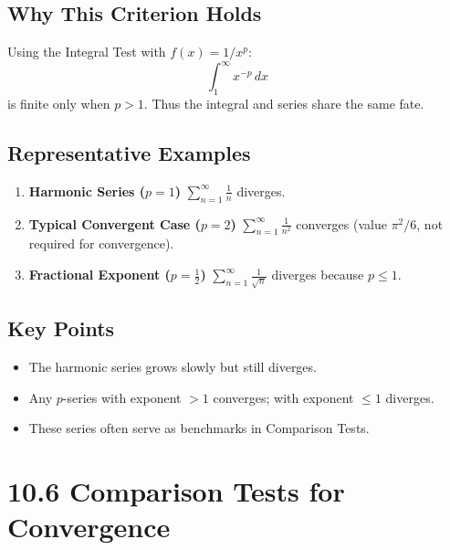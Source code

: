\documentclass{article}
\begin{document}
\subsection*{Why This Criterion Holds}
Using the Integral Test with \(f(x)=1/x^{p}\):
\[
\int_{1}^{\infty} x^{-p}\,dx
\]
is finite only when \(p>1\).  
Thus the integral and series share the same fate.

\subsection*{Representative Examples}

\begin{enumerate}[label=\textbf{\arabic*.},itemsep=8pt]

  \item \textbf{Harmonic Series (\(p=1\))}  
        \(\displaystyle\sum_{n=1}^{\infty}\frac{1}{n}\) diverges.

  \item \textbf{Typical Convergent Case (\(p=2\))}  
        \(\displaystyle\sum_{n=1}^{\infty}\frac{1}{n^{2}}\) converges  
        (value \(\pi^{2}/6\), not required for convergence).

  \item \textbf{Fractional Exponent (\(p=\tfrac12\))}  
        \(\displaystyle\sum_{n=1}^{\infty}\frac{1}{\sqrt{n}}\) diverges because \(p\le1\).

\end{enumerate}

\subsection*{Key Points}
\begin{itemize}[itemsep=4pt]
  \item The harmonic series grows slowly but still diverges.
  \item Any \(p\)-series with exponent \(>1\) converges; with exponent \(\le1\) diverges.
  \item These series often serve as benchmarks in Comparison Tests.
\end{itemize}

\newpage
\section{10.6  Comparison Tests for Convergence}
\end{document}
